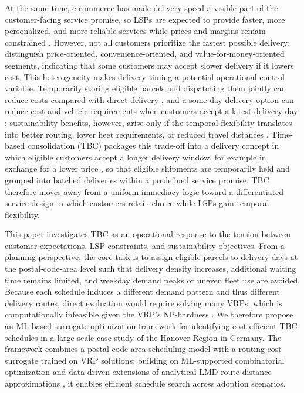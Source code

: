 \documentclass[preprint,12pt,authoryear]{elsarticle}
\begin{document}
At the same time, e-commerce has made delivery speed a visible part of the customer-facing service promise, so LSPs are expected to provide faster, more personalized, and more reliable services while prices and margins remain constrained \citep{Vivaldini}. However, not all customers prioritize the fastest possible delivery: \citet{Nguyen19} distinguish price-oriented, convenience-oriented, and value-for-money-oriented segments, indicating that some customers may accept slower delivery if it lowers cost. This heterogeneity makes delivery timing a potential operational control variable. Temporarily storing eligible parcels and dispatching them jointly can reduce costs compared with direct delivery \citep{PENG2023109044}, and a some-day delivery option can reduce cost and vehicle requirements when customers accept a latest delivery day \citep{Voigt2025SomeDayDelivery}; sustainability benefits, however, arise only if the temporal flexibility translates into better routing, lower fleet requirements, or reduced travel distances \citep{Zeelenberg2026WillingnessToWait}. Time-based consolidation (TBC) packages this trade-off into a delivery concept in which eligible customers accept a longer delivery window, for example in exchange for a lower price \citep{Naeimian2026TemporalConsolidation}, so that eligible shipments are temporarily held and grouped into batched deliveries within a predefined service promise. TBC therefore moves away from a uniform immediacy logic toward a differentiated service design in which customers retain choice while LSPs gain temporal flexibility.

This paper investigates TBC as an operational response to the tension between customer expectations, LSP constraints, and sustainability objectives. From a planning perspective, the core task is to assign eligible parcels to delivery days at the postal-code-area level such that delivery density increases, additional waiting time remains limited, and weekday demand peaks or uneven fleet use are avoided. Because each schedule induces a different demand pattern and thus different delivery routes, direct evaluation would require solving many VRPs, which is computationally infeasible given the VRP's NP-hardness \citep{LenstraRinnooyKan1981}. We therefore propose an ML-based surrogate-optimization framework for identifying cost-efficient TBC schedules in a large-scale case study of the Hanover Region in Germany. The framework combines a postal-code-area scheduling model with a routing-cost surrogate trained on VRP solutions; building on ML-supported combinatorial optimization \citep{BENGIO2021405} and data-driven extensions of analytical LMD route-distance approximations \citep{Figliozzi08, KIRUBAKARAN2026101720}, it enables efficient schedule search across adoption scenarios.
\end{document}
